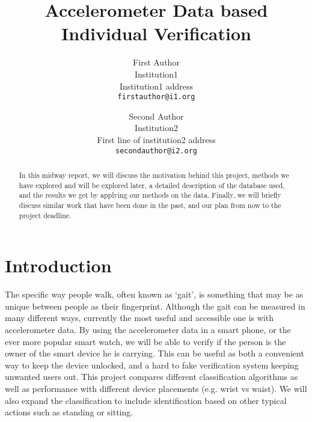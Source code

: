 \documentclass[10pt,twocolumn,letterpaper]{article}
\begin{document}
\title{Accelerometer Data based Individual Verification}

\author{First Author\\ 
Institution1\\
Institution1 address\\
{\tt\small firstauthor@i1.org}
\and
Second Author\\
Institution2\\
First line of institution2 address\\
{\tt\small secondauthor@i2.org}
}

\maketitle

\begin{abstract}
   In this midway report, we will discuss the motivation behind this project, methods we have explored and will be explored later, a detailed description of the database used, and the results we get by applying our methods on the data. Finally, we will briefly discuss similar work that have been done in the past, and our plan from now to the project deadline.
\end{abstract}

\section{Introduction}
The specific way people walk, often known as ‘gait’, is something that may be as unique between people as their fingerprint. Although the gait can be measured in many different ways, currently the most useful and accessible one is with accelerometer data. By using the accelerometer data in a smart phone, or the ever more popular smart watch, we will be able to verify if the person is the owner of the smart device he is carrying.  This can be useful as both a convenient way to keep the device unlocked, and a hard to fake verification system keeping unwanted users out. This project compares different classification algorithms as well as performance with different device placements (e.g. wrist vs waist).  We will also expand the classification to include identification based on other typical actions such as standing or sitting.
\end{document}
